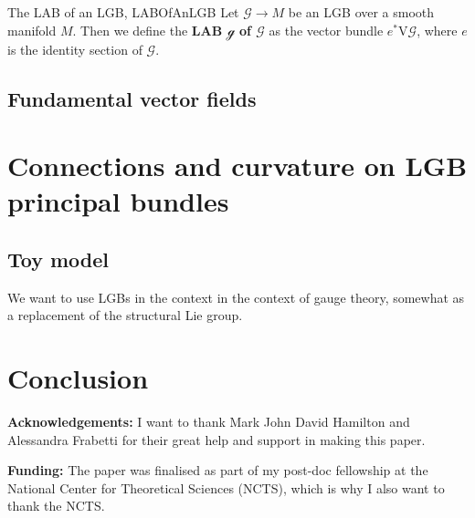 \documentclass[a4paper,oneside,11pt,bibliography=totoc]{scrartcl}
\renewcommand{\theequation}{\arabic{equation}}
\renewcommand{\listoffigures}{\begingroup
\tocsection
\tocfile{\listfigurename}{lof}
\endgroup}
\renewcommand{\listoftables}{\begingroup
\tocsection
\tocfile{\listtablename}{lot}
\endgroup}
\theoremstyle{plain}
\theoremstyle{remark}
\theoremstyle{definition}
\begin{document}
\begin{definitions}{The LAB of an LGB, \newline\cite[\S 3.5, special situation of Def.\ 3.5.1, page 120]{mackenzieGeneralTheory}}{LABOfAnLGB}
Let $\mathcal{G} \to M$ be an LGB over a smooth manifold $M$. Then we define the \textbf{LAB $\mathcal{g}$ of $\mathcal{G}$} as the vector bundle $e^*\mathrm{V}\mathcal{G}$, where $e$ is the identity section of $\mathcal{G}$.
\end{definitions}

\subsection{Fundamental vector fields}

\section{Connections and curvature on LGB principal bundles}

\subsection{Toy model}

We want to use LGBs in the context in the context of gauge theory, somewhat as a replacement of the structural Lie group. 

\section{Conclusion}

\textbf{Acknowledgements:} I want to thank Mark John David Hamilton and Alessandra Frabetti for their great help and support in making this paper.

\textbf{Funding:} The paper was finalised as part of my post-doc fellowship at the National Center for Theoretical Sciences (NCTS), which is why I also want to thank the NCTS.






\appendix
\setcounter{equation}{0}
\renewcommand{\theequation}{\Alph{chapter}.\arabic{equation}} %

\renewcommand\refname{List of References}
\end{document}
